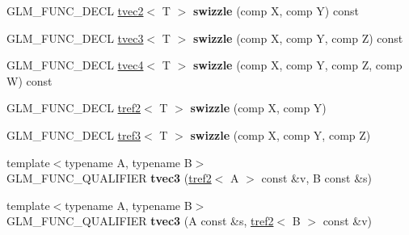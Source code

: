 \begin{DoxyCompactItemize}
\item 
\hypertarget{structglm_1_1detail_1_1tvec3_ab47b6ce6a2d23e20acec37087fb89a7e}{}G\+L\+M\+\_\+\+F\+U\+N\+C\+\_\+\+D\+E\+C\+L \hyperlink{structglm_1_1detail_1_1tvec2}{tvec2}$<$ T $>$ {\bfseries swizzle} (comp X, comp Y) const \label{structglm_1_1detail_1_1tvec3_ab47b6ce6a2d23e20acec37087fb89a7e}

\item 
\hypertarget{structglm_1_1detail_1_1tvec3_ad28f0de773115e3ffb607831537008f9}{}G\+L\+M\+\_\+\+F\+U\+N\+C\+\_\+\+D\+E\+C\+L \hyperlink{structglm_1_1detail_1_1tvec3}{tvec3}$<$ T $>$ {\bfseries swizzle} (comp X, comp Y, comp Z) const \label{structglm_1_1detail_1_1tvec3_ad28f0de773115e3ffb607831537008f9}

\item 
\hypertarget{structglm_1_1detail_1_1tvec3_ada514298c2f2fa218408e94527c6f134}{}G\+L\+M\+\_\+\+F\+U\+N\+C\+\_\+\+D\+E\+C\+L \hyperlink{structglm_1_1detail_1_1tvec4}{tvec4}$<$ T $>$ {\bfseries swizzle} (comp X, comp Y, comp Z, comp W) const \label{structglm_1_1detail_1_1tvec3_ada514298c2f2fa218408e94527c6f134}

\item 
\hypertarget{structglm_1_1detail_1_1tvec3_a2ee36b78d289564828faac8a4f28f683}{}G\+L\+M\+\_\+\+F\+U\+N\+C\+\_\+\+D\+E\+C\+L \hyperlink{structglm_1_1detail_1_1tref2}{tref2}$<$ T $>$ {\bfseries swizzle} (comp X, comp Y)\label{structglm_1_1detail_1_1tvec3_a2ee36b78d289564828faac8a4f28f683}

\item 
\hypertarget{structglm_1_1detail_1_1tvec3_a01f55f26122596b064d2a4ce256d5300}{}G\+L\+M\+\_\+\+F\+U\+N\+C\+\_\+\+D\+E\+C\+L \hyperlink{structglm_1_1detail_1_1tref3}{tref3}$<$ T $>$ {\bfseries swizzle} (comp X, comp Y, comp Z)\label{structglm_1_1detail_1_1tvec3_a01f55f26122596b064d2a4ce256d5300}

\item 
\hypertarget{structglm_1_1detail_1_1tvec3_a9705f6032040ba728ec42047f59e8fa2}{}{\footnotesize template$<$typename A, typename B$>$ }\\G\+L\+M\+\_\+\+F\+U\+N\+C\+\_\+\+Q\+U\+A\+L\+I\+F\+I\+E\+R {\bfseries tvec3} (\hyperlink{structglm_1_1detail_1_1tref2}{tref2}$<$ A $>$ const \&v, B const \&s)\label{structglm_1_1detail_1_1tvec3_a9705f6032040ba728ec42047f59e8fa2}

\item 
\hypertarget{structglm_1_1detail_1_1tvec3_aece9e36bdf4a35b681c6f50dc21ae917}{}{\footnotesize template$<$typename A, typename B$>$ }\\G\+L\+M\+\_\+\+F\+U\+N\+C\+\_\+\+Q\+U\+A\+L\+I\+F\+I\+E\+R {\bfseries tvec3} (A const \&s, \hyperlink{structglm_1_1detail_1_1tref2}{tref2}$<$ B $>$ const \&v)\label{structglm_1_1detail_1_1tvec3_aece9e36bdf4a35b681c6f50dc21ae917}


\end{DoxyCompactItemize}
